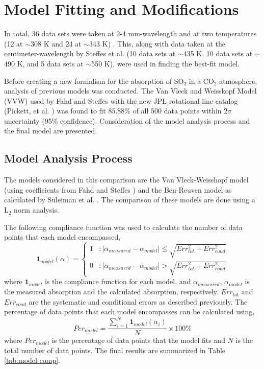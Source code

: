 \chapter{Model Fitting and Modifications}
In total, 36 data sets were taken at 2-4 mm-wavelength and at two temperatures (12 at $\sim$308 K and 24 at $\sim$343 K) . This, along with data taken at the centimeter-wavelength by Steffes et al. \cite{Steffes-2015} (10 data sets at $\sim$435 K, 10 data sets at $\sim$490 K, and 5 data sets at $\sim$550 K), were used in finding the best-fit model.

Before creating a new formalism for the absorption of SO$_2$ in a CO$_2$ atmosphere, analysis of previous models was conducted. The Van Vleck and Weisskopf Model (VVW) used by Fahd and Steffes \cite{Fahd-1991} with the new JPL rotational line catalog (Pickett, et al. \cite{Pickett-1998}) was found to fit 85.88\% of all 500 data points within $2\sigma$ uncertainty (95\% confidence). Consideration of the model analysis process and the final model are presented.


\section{Model Analysis Process}

The models considered in this comparison are the Van Vleck-Weisshopf model (using coefficients from Fahd and Steffes \cite{Fahd-1991}) and the Ben-Reuven model as calculated by Suleiman et al. \cite{Suleiman-1996}. The comparison of these models are done using a L$_2$ norm analysis. 

The following compliance function was used to calculate the number of data points that each model encompassed,
\begin{equation}
\textbf{1}_{model}(\alpha) = \left\{
     \begin{array}{lr}
       1 & : |\alpha_{measured} - \alpha_{model}| \leq \sqrt{Err_{tot}^2 + Err_{cond}^2 }\\
       0 & : |\alpha_{measured} - \alpha_{model}| > \sqrt{Err_{tot}^2 + Err_{cond}^2 }
     \end{array}
   \right.
\end{equation}
where $\textbf{1}_{model}$ is the compliance function for each model, and $\alpha_{measured}$, $\alpha_{model}$ is the measured absorption and the calculated absorption, respectively. $Err_{tot}$ and $Err_{cond}$ are the systematic and conditional errors as described previously. The percentage of data points that each model encompasses can be calculated using,
\begin{equation}
Per_{model} = \frac{\sum_{i=1}^N \textbf{1}_{model}(\alpha_i)}{N}\times 100\%
\end{equation}
where $Per_{model}$ is the percentage of data points that the model fits and $N$ is the total number of data points. The final results are summarized in Table \ref{tab:model-comp}.

